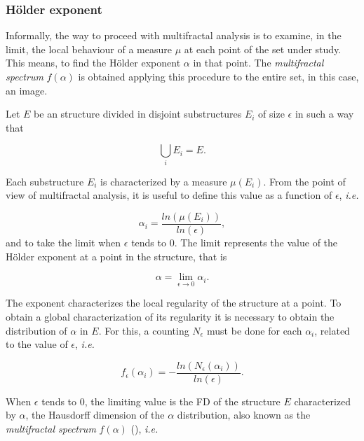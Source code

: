\documentclass[oneside,a4paper,english,links]{amca}
\begin{document}
\subsubsection{H\"older exponent}
Informally, the way to proceed with multifractal analysis is to examine, in the limit, the local behaviour of a measure $\mu$ at each point of the set under study. This means, to find the H\"older exponent $\alpha$ in that point. The {\em multifractal spectrum} $f(\alpha)$ is obtained applying this procedure to the entire set, in this case, an image.

Let $E$ be an structure divided in disjoint substructures $E_{i}$ of size $\epsilon$ in such a way that 

\begin{equation}
\displaystyle\bigcup_{i}E_{i} = E.
\end{equation}

Each substructure $E_{i}$ is characterized by a measure $\mu(E_{i})$. From the point of view of multifractal analysis, it is useful to define this value as a function of $\epsilon$, {\em i.e.}


\begin{equation}
\alpha_{i} = \frac{ln(\mu(E_{i}))}{ln(\epsilon)},
\label{eqn:eqn4}
\end{equation}
\noindent
and to take the limit when $\epsilon$ tends to $0$. The limit represents the value of the H\"older exponent at a point in the structure, that is

\begin{equation}
\alpha = \lim_{\epsilon\to0}{\alpha_{i}}.
\label{eqn:eqn5}
\end{equation}

The exponent characterizes the local regularity of the structure at a point. To obtain a global characterization of its regularity it is necessary to obtain the distribution of $\alpha$ in $E$. For this, a counting $N_{\epsilon}$ must be done for each $\alpha_{i}$, related to the value of $\epsilon$, {\em i.e.}

\begin{equation}
f_{\epsilon}(\alpha_{i}) = - \frac{ln(N_{\epsilon}(\alpha_{i}))}{ln(\epsilon)}.
\label{eqn:eqn6}
\end{equation}

When $\epsilon$ tends to $0$, the limiting value is the FD of the structure $E$ characterized by $\alpha$, the Hausdorff dimension of the $\alpha$ distribution, also known as the {\em multifractal spectrum} $f(\alpha)$ (\cite{Silvetti2010}), {\em i.e.}
\end{document}
